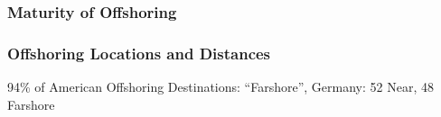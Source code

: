 \subsubsection{Maturity of Offshoring}

\subsubsection{Offshoring Locations and Distances}
94\% of American Offshoring Destinations: ``Farshore'', Germany: 52 Near, 48 Farshore \cite[pp. 175f]{Hutzschenreuter.2007}

